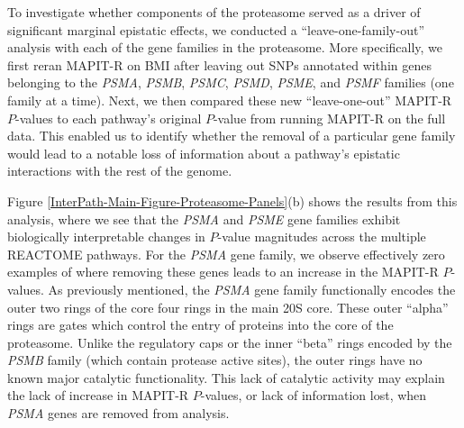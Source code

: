 \documentclass[10pt,a4paper]{article}
\begin{document}
To investigate whether components of the proteasome served as a driver of significant marginal epistatic effects, we conducted a ``leave-one-family-out'' analysis with each of the gene families in the proteasome. More specifically, we first reran MAPIT-R on BMI after leaving out SNPs annotated within genes belonging to the \textit{PSMA}, \textit{PSMB}, \textit{PSMC}, \textit{PSMD}, \textit{PSME}, and \textit{PSMF} families (one family at a time). Next, we then compared these new ``leave-one-out'' MAPIT-R $P$-values to each pathway's original $P$-value from running MAPIT-R on the full data. This enabled us to identify whether the removal of a particular gene family would lead to a notable loss of information about a pathway's epistatic interactions with the rest of the genome. 
 
Figure \ref{InterPath-Main-Figure-Proteasome-Panels}(b) shows the results from this analysis, where we see that the \textit{PSMA} and \textit{PSME} gene families exhibit biologically interpretable changes in $P$-value magnitudes across the multiple REACTOME pathways. For the \textit{PSMA} gene family, we observe effectively zero examples of where removing these genes leads to an increase in the MAPIT-R $P$-values. As previously mentioned, the \textit{PSMA} gene family functionally encodes the outer two rings of the core four rings in the main 20S core. These outer ``alpha'' rings are gates which control the entry of proteins into the core of the proteasome. Unlike the regulatory caps or the inner ``beta'' rings encoded by the \textit{PSMB} family (which contain protease active sites), the outer rings have no known major catalytic functionality. This lack of catalytic activity may explain the lack of increase in MAPIT-R $P$-values, or lack of information lost, when \textit{PSMA} genes are removed from analysis. 
 
\end{document}

